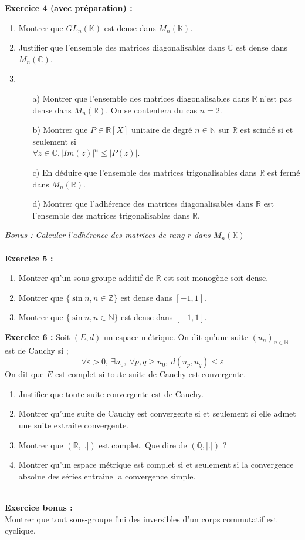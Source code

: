 \documentclass[11pt,a4paper]{article}
\begin{document}
\textbf{Exercice 4 (avec préparation) :}
\begin{enumerate}
\item Montrer que $GL_n(\mathbb{K})$ est dense dans $M_n(\mathbb{K})$.
\item Justifier que l'ensemble des matrices diagonalisables dans $\mathbb{C}$ est dense dans $M_n(\mathbb{C})$.
\item 
\begin{itemize}
\item[a)] Montrer que l’ensemble des matrices diagonalisables dans $\mathbb{R}$ n’est pas dense dans $M_n(\mathbb{R})$. On se contentera du cas $n=2$.
\item[b)] Montrer que $P\in \mathbb{R}[X]$ unitaire de degré $n\in \mathbb{N}$ sur $\mathbb{R}$ est scindé si et seulement si \\ $ \forall z \in \mathbb{C},|Im(z)|^n \leq |P(z)|$.
\item[c)] En déduire que l'ensemble des matrices trigonalisables dans $\mathbb{R}$ est fermé dans $M_n(\mathbb{R})$.
\item[d)]  Montrer que l’adhérence des matrices diagonalisables dans $\mathbb{R}$ est l’ensemble des matrices
trigonalisables dans $\mathbb{R}$.
\end{itemize}
\end{enumerate}
\textit{Bonus : Calculer l'adhérence des matrices de rang $r$ dans $M_n(\mathbb{K})$} \\
~\\

\textbf{Exercice 5 :}
\begin{enumerate}
\item Montrer qu'un sous-groupe additif de $\mathbb{R}$ est soit monogène soit dense.
\item Montrer que $ \lbrace \sin{n}, n \in \mathbb{Z} \rbrace $ est dense dans $[-1,1]$.
\item Montrer que $ \lbrace \sin{n}, n \in \mathbb{N} \rbrace $ est dense dans $[-1,1]$.
\end{enumerate}
\newpage

\textbf{Exercice 6 :}
Soit $(E,d)$ un espace métrique. On dit qu'une suite $(u_n)_{n \in \mathbb{N}}$ est de Cauchy si ; \[\forall \varepsilon >0, \ \exists n_0, \ \forall p,q \geq n_0,\ d(u_p,u_q)\leq \varepsilon\]
On dit que $E$ est complet si toute suite de Cauchy est convergente.
\begin{enumerate}
\item Justifier que toute suite convergente est de Cauchy.
\item Montrer qu'une suite de Cauchy est convergente si et seulement si elle admet une suite extraite convergente.
\item Montrer que $(\mathbb{R},|.|)$ est complet. Que dire de $(\mathbb{Q},|.|)$ ?
\item Montrer qu'un espace métrique est complet si et seulement si la convergence absolue des séries entraine la convergence simple.
\end{enumerate}
~\\

\textbf{Exercice bonus :} \\
Montrer que tout sous-groupe fini des inversibles d'un corps commutatif est cyclique. \
\end{document}
